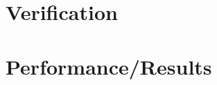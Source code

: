 \documentclass[x11names,twoside,english]{uiofysmaster}
\begin{document}
\chapter{Verification}
    
    
    
    
    
    
%
\chapter{Performance/Results}
    
    
    
    



%   
%
%   
%
%     
%
%     
%
%     
%
%     
%     
%     

%     


%
\printbibliography
\end{document}
